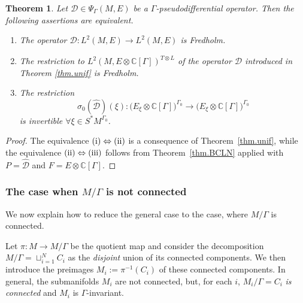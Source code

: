 \documentclass[11pt,a4paper]{amsart}
\newcommand{\C}{\mathbb C}
\newcommand{\maD}{\mathcal D}
\newcommand\ede{\, := \,}
\newcommand\<{\langle}
\renewcommand\>{\rangle}
\newtheorem{theorem}{Theorem}[section]
\theoremstyle{definition}
\begin{document}
\begin{theorem}\label{thm.main}
Let $\maD \in \Psi_\Gamma(M,E)$ be a $\Gamma$-pseudodifferential operator. 
Then the following assertions are equivalent.
\begin{enumerate}\renewcommand{\labelenumi}{\rm(\roman{enumi})}
\item The operator $\maD:L^2(M,E)\to L^2(M,E)$ is Fredholm.
\item The restriction to $L^2(M,E \otimes \C[\Gamma])^{T\otimes L}$ 
of the operator $\hat{\maD}$ introduced in Theorem \ref{thm.unif} is Fredholm.
\item The restriction 
\begin{equation}\label{eq-smbl31}
 \sigma_0(\hat{\maD})(\xi) : \big(E_\xi \otimes \C[\Gamma]\big)^{\Gamma_0} \rightarrow \big(E_\xi \otimes \C[\Gamma]\big)^{\Gamma_0}  
\end{equation}
is invertible $\forall \xi \in S^*M^{\Gamma_0}$.
\end{enumerate} 
\end{theorem}

\begin{proof}
The  equivalence $(\rm{i}) \Leftrightarrow (ii)$ is a consequence of Theorem~\ref{thm.unif},
while the equivalence $(\rm{ii}) \Leftrightarrow (iii) $ 
follows from Theorem~\ref{thm.BCLN} applied with $P=\hat{\maD}$ and  $F=E \otimes \C[\Gamma]$. 
\end{proof}


\subsubsection*{The case when $M/\Gamma$ is not connected} 

We now explain how to reduce the general case to the case, where  $M/\Gamma$ is connected.

Let $\pi : M \to M/\Gamma$ be the quotient map and consider the decomposition
$M/\Gamma = \sqcup_{i=1}^N C_i$ as the {\em disjoint} union
of its connected components. 
We then introduce the preimages $M_i := \pi^{-1}(C_i)$
 of these connected components. In
general, the submanifolds $M_i$ are not connected, but, for each $i$,
$M_i/\Gamma = C_i$ {\em is connected} and   $M_i$ is $\Gamma$-invariant. 

\end{document}
